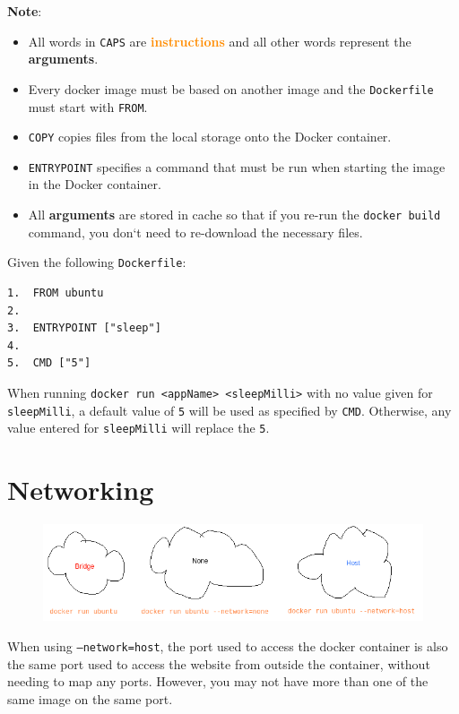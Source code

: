 \documentclass[a4paper, 12pt]{article}
\newcommand{\bc}[2]{\textbf{\textcolor{#1}{#2}}}
\begin{document}
\textbf{Note}:
\begin{itemize}
	\item All words in \texttt{CAPS} are \bc{darkorange}{instructions} and all
	other words represent the \bc{darkyellow}{arguments}.
	\item Every docker image must be based on another image and the
	\texttt{Dockerfile} must start with \texttt{FROM}.
	\item \texttt{COPY} copies files from the local storage onto the Docker
	container.
	\item \texttt{ENTRYPOINT} specifies a command that must be run when starting
	the image in the Docker container.
	\item All \bc{darkyellow}{arguments} are stored in cache so that if you
	re-run the \texttt{docker build} command, you don`t need to re-download the
	necessary files.
\end{itemize}

Given the following \texttt{Dockerfile}:
\begin{verbatim}
1.  FROM ubuntu
2.
3.  ENTRYPOINT ["sleep"]
4.
5.  CMD ["5"]
\end{verbatim}

When running \texttt{docker run <appName> <sleepMilli>} with no value given for
\texttt{sleepMilli}, a default value of \texttt{5} will be used as specified
by \texttt{CMD}. Otherwise, any value entered for \texttt{sleepMilli} will
replace the \texttt{5}.

\section{Networking}

\begin{figure}[H]
	\centering
	\includegraphics[scale=0.5]{network.png}
\end{figure}

When using \texttt{--network=host}, the port used to access the docker container
is also the same port used to access the website from outside the container,
without needing to map any ports. However, you may not have more than one of the
same image on the same port.
\end{document}
